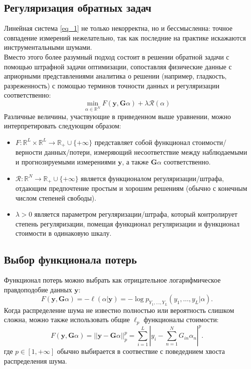 \documentclass[a4paper,12pt]{article}
\theoremstyle{plain}
\theoremstyle{definition}
\theoremstyle{remark}
\newcommand{\nl}{\\ \indent}
\begin{document}
\subsection{Регуляризация обратных задач}
Линейная система \eqref{eq_1} не только некорректна, 
но и бессмысленна: точное совпадение измерений нежелательно, 
так как последние на практике искажаются инструментальными шумами.
\nl
Вместо этого более разумный подход состоит в решении 
обратной задачи с помощью штрафной задачи оптимизации, 
сопоставляя физические данные с априорными представлениями
аналитика о решении (например, гладкость, разреженность) 
с помощью терминов точности данных и регуляризации 
соответственно:
\[
\min_{\alpha \in \mathbb{R}^N}
F(\textbf{y}, \textbf{G} \alpha) +
\lambda \mathcal{R} (\alpha)
\]
Различные величины, участвующие в приведенном выше уравнении, 
можно интерпретировать следующим образом:
\begin{itemize}
\item 
$F: \mathbb{R}^L \times \mathbb{R}^L 
\rightarrow \mathbb{R}_{+} \cup \{ + \infty \}$
представляет собой функционал 
стоимости/верности данных/потери, 
измеряющий несоответствие между наблюдаемыми и 
прогнозируемыми измерениями $\textbf{y}$, 
а также $\textbf{G} \alpha$ соответственно.
\item 
$\mathcal{R}: \mathbb{R}^N 
\rightarrow \mathbb{R}_{+} \cup \{ + \infty \}$ является
функционалом регуляризации/штрафа,
отдающим предпочтение простым и хорошим решениям 
(обычно с конечным числом степеней свободы).
\item 
$\lambda > 0$ является параметром регуляризации/штрафа, 
который контролирует степень регуляризации, 
помещая функционал регуляризации и функционал 
стоимости в одинаковую шкалу.
\end{itemize}
\subsection{Выбор функционала потерь}
Функционал потерь можно выбрать как отрицательное 
логарифмическое правдоподобие данных $\textbf{y}$:
\[
F(\textbf{y}, \textbf{G} \alpha) =
- \ell(\alpha | \textbf{y}) =
- \log p_{Y_1, \ldots, Y_L}
(y_1, \ldots, y_L | \alpha).
\]
Когда распределение шума не известно полностью или 
вероятность слишком сложна, 
можно также использовать общие $\ell_p$ функционалы стоимости:
\[
F(\textbf{y}, \textbf{G} \alpha) =
||\textbf{y} - \textbf{G} \alpha||_p^p = 
\sum\limits_{i=1}^L
\left| 
y_i -
\sum\limits_{n=1}^N
G_{in} \alpha_n 
\right|^p.
\]
где $p \in [1, +\infty]$
обычно выбирается в соотвествие с поведеднием
хвоста распределения шума.
\end{document}

